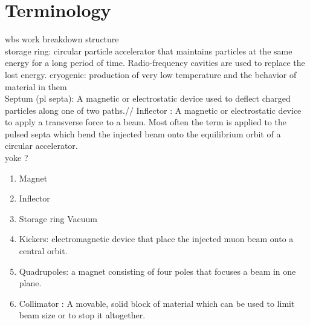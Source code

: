 \documentclass[]{article}
\begin{document}
\section*{Terminology}
wbs work breakdown structure\\
storage ring: circular particle accelerator that maintains particles at the same energy for a long period of time. Radio-frequency cavities are used to replace the lost energy.
cryogenic: production of very low temperature and the behavior of material in them\\
Septum (pl septa): A magnetic or electrostatic device used to deflect charged particles along one of two paths.//
Inflector : A magnetic or electrostatic device to apply a transverse force to a beam. Most often the term is applied to the pulsed septa which bend the injected beam onto the equilibrium orbit of a circular accelerator. \\
yoke ?
\begin{enumerate}
\item Magnet
\item Inflector
\item Storage ring Vacuum
\item Kickers: electromagnetic device that place the injected muon beam onto a central orbit. 
\item Quadrupoles: a magnet consisting of four poles that focuses a beam in one plane. 
\item Collimator : A movable, solid block of material which can be used to limit beam size or to stop it altogether. 

\end{enumerate}
\end{document}
